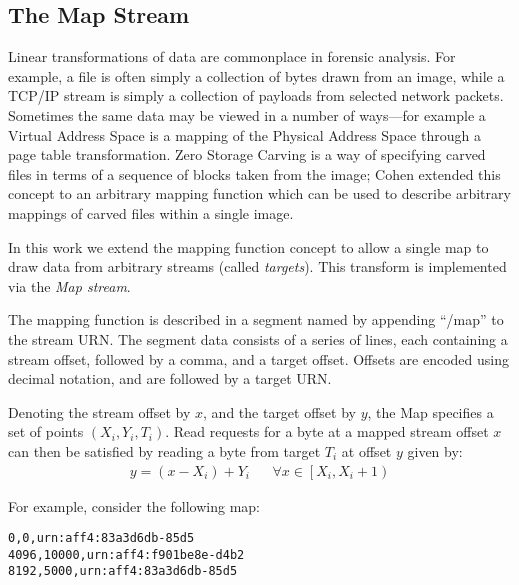 \documentclass[10pt, conference]{IEEEtran}
\begin{document}

\subsection{The Map Stream}
\label{map_stream}
Linear transformations of data are commonplace in forensic
analysis. For example, a file is often simply a collection of bytes
drawn from an image, while a TCP/IP stream is simply a collection of
payloads from selected network packets. Sometimes the same data may be
viewed in a number of ways---for example a Virtual Address Space is a
mapping of the Physical Address Space through a page table
transformation.  Zero Storage Carving\cite{Meijer2006} is a way of
specifying carved files in terms of a sequence of blocks taken from
the image; Cohen extended this concept to an arbitrary mapping
function\cite{1363239,Cohen2007} which can be used to describe
arbitrary mappings of carved files within a single image.

In this work we extend the mapping function concept to allow a single
map to draw data from arbitrary streams (called {\em targets}). This
transform is implemented via the {\em Map stream}.

The mapping function is described in a segment named by appending
``/map'' to the stream URN. The segment data consists of a series of
lines, each containing a stream offset, followed by a comma, and a
target offset. Offsets are encoded using decimal notation, and are
followed by a target URN.

Denoting the stream offset by $x$, and the target offset by $y$, the
Map specifies a set of points $(X_i,Y_i,T_i)$. Read requests for a
byte at a mapped stream offset $x$ can then be satisfied by reading a
byte from target $T_i$ at offset $y$ given by:
\begin{eqnarray}
y = (x - X_i) + Y_i & &
\forall x \in \left [X_i, X_i+1 \right )
\end{eqnarray}

For example, consider the following map:
\begin{lstlisting}
0,0,urn:aff4:83a3d6db-85d5
4096,10000,urn:aff4:f901be8e-d4b2
8192,5000,urn:aff4:83a3d6db-85d5
\end{lstlisting}
\end{document}
